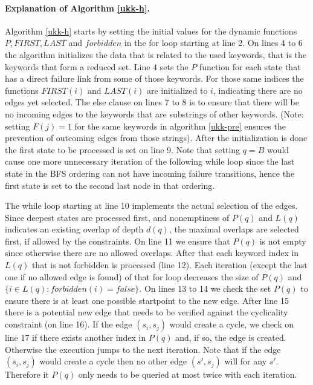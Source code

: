 \documentclass[english,twoside,censored,csm,algorithms-track-2020]{HYthesisML}
\theoremstyle{plain}
\theoremstyle{definition}
\numberwithin{testexample}{chapter}
\begin{document}
\paragraph{Explanation of Algorithm \ref{ukk-h}.}
Algorithm \ref{ukk-h} starts by setting the initial values for the dynamic functions
$P, FIRST, LAST$ and $forbidden$ in the for loop starting at line 2. On lines 4 to 6 the algorithm
initializes the data that is related to the used keywords, that is the keywords that form a reduced set.
Line 4 sets the $P$ function for each state that has a direct failure link from some of
those keywords. For those same indices the functions $FIRST(i)$ and $LAST(i)$ are initialized
to $i$, indicating there are no edges yet selected. The else clause on lines 7 to 8 is
to ensure that there will be no incoming edges to the keywords that are substrings of other
keywords. (Note: setting $F(j) = 1$ for the same keywords in algorithm \ref{ukk-pre} ensures
the prevention of outcoming edges from those strings). After the initialization is done the
first state to be processed is set on line 9. Note that setting $q=B$ would cause one more unnecessary
iteration of the following while loop since the last state in the BFS ordering can not have
incoming failure transitions, hence the first state is set to the second last node in that
ordering.


The while loop starting at line 10 implements the actual selection of the edges. Since
deepest states are processed first, and nonemptiness of $P(q)$ and $L(q)$ indicates an existing
overlap of depth $d(q)$, the maximal overlaps are selected first, if allowed by the constraints.
On line 11 we ensure that $P(q)$ is not empty since otherwise there are no allowed overlaps.
After that each keyword index in $L(q)$ that is not forbidden is processed (line 12). Each
iteration (except the last one if no allowed edge is found) of that for loop decreases the
size of $P(q)$ and $\{i\in L(q) : forbidden(i) = false\}$. On lines 13 to 14 we check 
the set $P(q)$ to ensure there is at least one possible startpoint to the new edge. After line 15
there is a potential new edge that needs to be verified against the cyclicality constraint
(on line 16). If the edge $(s_i,s_j)$ would create a cycle, we check on line 17 if there exists
another index in $P(q)$ and, if so, the edge is created. Otherwise the execution jumps to the
next iteration. Note that if the edge $(s_i,s_j)$ would create a cycle then no other edge $(s',s_j)$
will for any $s'$. Therefore it $P(q)$ only needs to be queried at most twice with each iteration.
\end{document}
